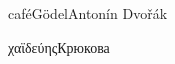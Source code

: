 \documentclass{article}
\begin{document}
café\quad Gödel\quad Antonín Dvořák

χαϊδεύης\qquad Крюкова
\end{document}
